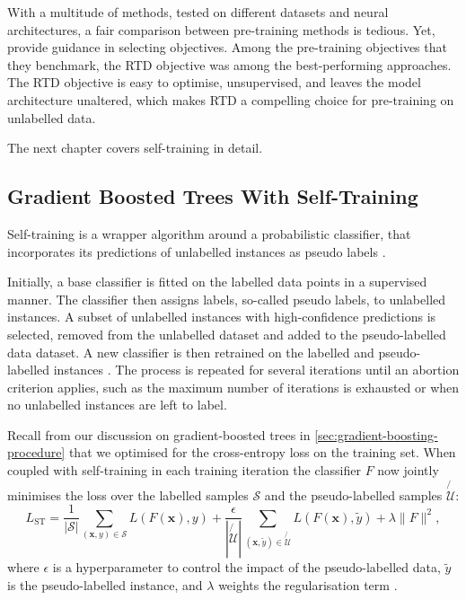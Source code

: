 With a multitude of methods, tested on different datasets and neural architectures, a fair comparison between pre-training methods is tedious. Yet, \textcite[][2-3]{rubachevRevisitingPretrainingObjectives2022} provide guidance in selecting objectives. Among the pre-training objectives that they benchmark, the \gls{RTD} objective was among the best-performing approaches. The \gls{RTD} objective is easy to optimise, unsupervised, and leaves the model architecture unaltered, which makes \gls{RTD} a compelling choice for pre-training on unlabelled data.

The next chapter covers self-training in detail.

\subsection{Gradient Boosted Trees With Self-Training}\label{sec:extensions-to-gradient-boosted-trees}

Self-training is a wrapper algorithm around a probabilistic classifier, that incorporates its predictions of unlabelled instances as pseudo labels \autocite[][190]{yarowskyUnsupervisedWordSense1995}.

Initially, a base classifier is fitted on the labelled data points in a supervised manner. The classifier then assigns labels, so-called pseudo labels, to unlabelled instances. A subset of unlabelled instances with high-confidence predictions is selected, removed from the unlabelled dataset and added to the pseudo-labelled data dataset. A new classifier is then retrained on the labelled and pseudo-labelled instances \autocite[][190--192]{yarowskyUnsupervisedWordSense1995}. The process is repeated for several iterations until an abortion criterion applies, such as the maximum number of iterations is exhausted or when no unlabelled instances are left to label.

Recall from our discussion on gradient-boosted trees in \cref{sec:gradient-boosting-procedure} that we optimised for the cross-entropy loss on the training set. When coupled with self-training in each training iteration the classifier $F$ now jointly minimises the loss over the labelled samples $\mathcal{S}$ and the pseudo-labelled samples $\not{\mathcal{U}}$:
\begin{equation}
    L_{\mathrm{ST}}=\frac{1}{\left|\mathcal{S}\right|} \sum_{(\mathbf{x}, y) \in \mathcal{S}} L(F(\mathbf{x}), y)+\frac{\epsilon}{\left|\not{\mathcal{U}}\right|} \sum_{(\mathbf{x}, \tilde{y}) \in \not{\mathcal{U}}} L(F(\mathbf{x}), \tilde{y})+\lambda\|F\|^2,
\end{equation}
where $\epsilon$ is a hyperparameter to control the impact of the pseudo-labelled data, $\tilde{y}$ is the pseudo-labelled instance, and $\lambda$ weights the regularisation term \autocite[][4]{aminiSelfTrainingSurvey2023}.

